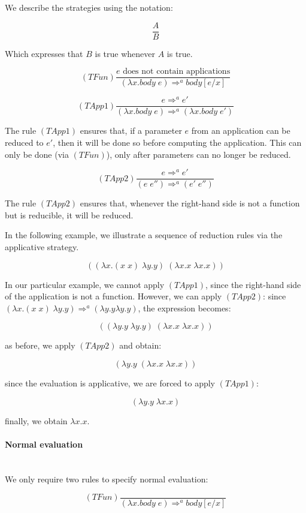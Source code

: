 We describe the strategies using the notation:

$$ \frac{A}{B} $$
  
Which expresses that $B$ is true whenever $A$ is true.

$$ (TFun) \frac{e \text{ does not contain applications}}{(\lambda x.body\; e) \Rightarrow^a body[e/x]} $$

$$ (TApp1) \frac{e \Rightarrow^a e'}{(\lambda x.body\; e) \Rightarrow^a (\lambda x.body\;e')} $$

The rule $(TApp1)$ ensures that, if a parameter $e$ from an application can be reduced to $e'$, then it will be done so before computing the application. This can only be done (via $(TFun)$), only after parameters can no longer be reduced.

$$ (TApp2) \frac{e \Rightarrow^a e'}{(e\;e'')\Rightarrow^a (e'\;e'')}$$

The rule $(TApp2)$ ensures that, whenever the right-hand side is not a function but is reducible, it will be reduced.

In the following example, we illustrate a sequence of reduction rules via the applicative strategy.

$$ ((\lambda x.(x\;x)\;\lambda y.y)\;(\lambda x.x\;\lambda x.x))$$

In our particular example, we cannot apply $(TApp1)$, since the right-hand side of the application is not a function. However, we can apply $(TApp2)$: since $(\lambda x.(x\;x)\;\lambda y.y) \Rightarrow^a (\lambda y.y \lambda y.y)$, the expression becomes:

$$ ((\lambda y.y\;\lambda y.y)\;(\lambda x.x\;\lambda x.x))$$

as before, we apply $(TApp2)$ and obtain:

$$ (\lambda y.y\;(\lambda x.x\;\lambda x.x))$$

since the evaluation is applicative, we are forced to apply $(TApp1)$:

$$ (\lambda y.y\;\lambda x.x)$$

finally, we obtain $\lambda x.x$.

\paragraph{ Normal evaluation }\hfill\\

We only require two rules to specify normal evaluation:

$$ (TFun) \frac{}{(\lambda x.body\; e) \Rightarrow^a body[e/x]} $$

